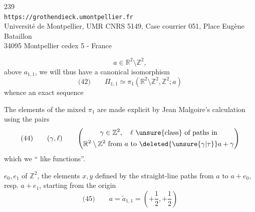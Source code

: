 \begin{center}
239\\
\texttt{https://grothendieck.umontpellier.fr}\\
Université de Montpellier, UMR CNRS 5149, Case courrier 051, Place Eugène Bataillon\\
34095 Montpellier cedex 5 - France
\end{center}


\[
a\in\mathbb R^2\setminus\mathbb Z^2,
\]
 above $a_{1,1}$, we will thus have a canonical isomorphism
\[
\text{(42)}\qquad
\Pi_{1,1}\simeq\pi_1(\mathbb R^2\setminus\mathbb Z^2,\mathbb Z^2;a)
\]
whence an exact sequence

The elements of the mixed $\pi_1$ are made explicit by Jean Malgoire's calculation using the pairs
\[
\text{(44)}\qquad
(\gamma,\ell)\qquad
\left(\begin{gathered}
\gamma\in\mathbb Z^2,\quad \ell\ \text{\unsure{class} of paths in}\\
\mathbb R^2\setminus\mathbb Z^2\ \text{from }a\text{ to }\deleted{\unsure{\gamma|\tau}}a+\gamma
\end{gathered}\right)
\]
which we `` like functions''.

$e_0,e_1$ of $\mathbb Z^2$, the elements $x,y$ defined by the straight-line paths from $a$ to $a+e_0$, resp. $a+e_1$, starting from the origin
\[
\text{(45)}\qquad
 a=\widetilde a_{1,1}=\left(+\frac12,+\frac12\right)
\]

